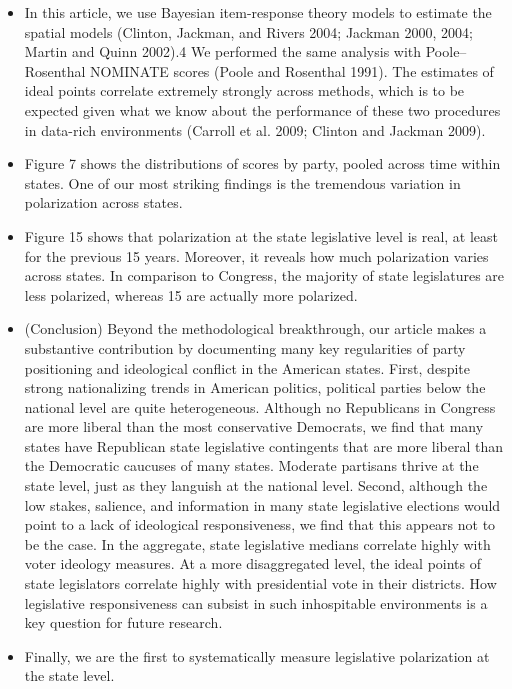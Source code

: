\documentclass[a4paper,12pt]{article}
\begin{document}
\begin{enumerate}
\begin{itemize}
\item In this article, we use Bayesian item-response theory models to estimate the spatial models (Clinton, Jackman, and Rivers 2004; Jackman 2000, 2004; Martin and Quinn 2002).4 We performed the same analysis with Poole–Rosenthal NOMINATE scores (Poole and Rosenthal 1991). The estimates of ideal points correlate extremely strongly across methods, which is to be expected given what we know about the performance of these two procedures in data-rich environments (Carroll et al. 2009; Clinton and Jackman 2009). 
\item Figure 7 shows the distributions of scores by party, pooled across time within states. One of our most striking findings is the tremendous variation in polarization across states. 
\item Figure 15 shows that polarization at the state legislative level is real, at least for the previous 15 years. Moreover, it reveals how much polarization varies across states. In comparison to Congress, the majority of state legislatures are less polarized, whereas 15 are actually more polarized. 
\item (Conclusion) Beyond the methodological breakthrough, our article makes a substantive contribution by documenting many key regularities of party positioning and ideological conflict in the American states. First, despite strong nationalizing trends in American politics, political parties below the national level are quite heterogeneous. Although no Republicans in Congress are more liberal than the most conservative Democrats, we find that many states have Republican state legislative contingents that are more liberal than the Democratic caucuses of many states. Moderate partisans thrive at the state level, just as they languish at the national level. Second, although the low stakes, salience, and information in many state legislative elections would point to a lack of ideological responsiveness, we find that this appears not to be the case. In the aggregate, state legislative medians correlate highly with voter ideology measures. At a more disaggregated level, the ideal points of state legislators correlate highly with presidential vote in their districts. How legislative responsiveness can subsist in such inhospitable environments is a key question for future research.  
\item Finally, we are the first to systematically measure legislative polarization at the state level. 
\end{itemize}


\end{enumerate}
\end{document}
